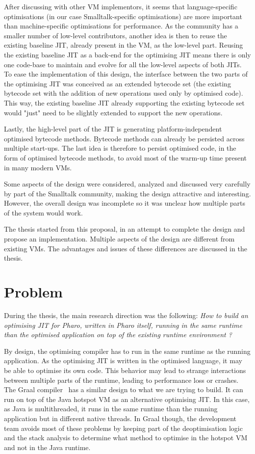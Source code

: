 \documentclass[a4paper,12pt,twoside]{../includes/ThesisStyle}
\begin{document}
After discussing with other VM implementors, it seems that language-specific optimisations (in our case Smalltalk-specific optimisations) are more important than machine-specific optimisations for performance. As the community has a smaller number of low-level contributors, another idea is then to reuse the existing baseline JIT, already present in the VM, as the low-level part. Reusing the existing baseline JIT as a back-end for the optimising JIT means there is only one code-base to maintain and evolve for all the low-level aspects of both JITs. To ease the implementation of this design, the interface between the two parts of the optimising JIT was conceived as an extended bytecode set (the existing bytecode set with the addition of new operations used only by optimised code). This way, the existing baseline JIT already supporting the existing bytecode set would "just" need to be slightly extended to support the new operations.

Lastly, the high-level part of the JIT is generating platform-independent optimised bytecode methods. Bytecode methods can already be persisted across multiple start-ups. The last idea is therefore to persist optimised code, in the form of optimised bytecode methods, to avoid most of the warm-up time present in many modern VMs.

Some aspects of the design were considered, analyzed and discussed very carefully by part of the Smalltalk community, making the design attractive and interesting. However, the overall design was incomplete so it was unclear how multiple parts of the system would work. 

The thesis started from this proposal, in an attempt to complete the design and propose an implementation. Multiple aspects of the design are different from existing VMs. The advantages and issues of these differences are discussed in the thesis.

\section{Problem}

During the thesis, the main research direction was the following:
\emph{How to build an optimising JIT for Pharo, written in Pharo itself, running in the same runtime than the optimised application on top of the existing runtime environment ?} 

By design, the optimising compiler has to run in the same runtime as the running application. As the optimising JIT is written in the optimised language, it may be able to optimise its own code. This behavior may lead to strange interactions between multiple parts of the runtime, leading to performance loss or crashes. The Graal compiler~\cite{Dubo13c} has a similar design to what we are trying to build. It can run on top of the Java hotspot VM as an alternative optimising JIT. In this case, as Java is multithreaded, it runs in the same runtime than the running application but in different native threads. In Graal though, the development team avoids most of these problems by keeping part of the deoptimisation logic and the stack analysis to determine what method to optimise in the hotspot VM and not in the Java runtime. 
\end{document}

